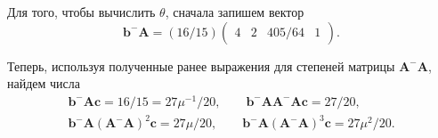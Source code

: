 \documentclass[specialist,
               substylefile = spbu.rtx,
               subf,href,colorlinks=true, 12pt]{disser}
\theoremstyle{definition}
\begin{document}
%

Для того, чтобы вычислить $\theta$, сначала запишем вектор
\begin{equation*}
\bm{b}^{-}\bm{A}
=
(16/15)
\begin{pmatrix}
4 &2 &405/64 &1
\end{pmatrix}.
\end{equation*}
 
 Теперь, используя полученные ранее выражения для степеней матрицы $\bm{A}^{-}\bm{A}$, найдем числа
\begin{gather*}
\bm{b}^{-}\bm{A}\bm{c}
=
16/15=27\mu^{-1}/20,
\qquad
\bm{b}^{-}\bm{A}\bm{A}^{-}\bm{A}\bm{c}
=
27/20,
\\
\bm{b}^{-}\bm{A}(\bm{A}^{-}\bm{A})^{2}\bm{c}
=
27\mu/20,
\qquad
\bm{b}^{-}\bm{A}(\bm{A}^{-}\bm{A})^{3}\bm{c}
=
27\mu^{2}/20.
\end{gather*}
\end{document}
